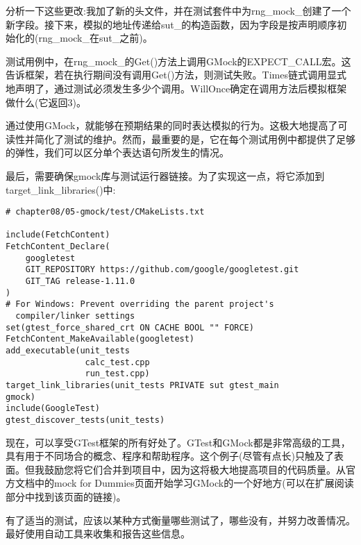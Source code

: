 分析一下这些更改:我加了新的头文件，并在测试套件中为rng\_mock\_创建了一个新字段。接下来，模拟的地址传递给sut\_的构造函数，因为字段是按声明顺序初始化的(rng\_mock\_在sut\_之前)。

测试用例中，在rng\_mock\_的Get()方法上调用GMock的EXPECT\_CALL宏。这告诉框架，若在执行期间没有调用Get()方法，则测试失败。Times链式调用显式地声明了，通过测试必须发生多少个调用。WillOnce确定在调用方法后模拟框架做什么(它返回3)。

通过使用GMock，就能够在预期结果的同时表达模拟的行为。这极大地提高了可读性并简化了测试的维护。然而，最重要的是，它在每个测试用例中都提供了足够的弹性，我们可以区分单个表达语句所发生的情况。

最后，需要确保gmock库与测试运行器链接。为了实现这一点，将它添加到target\_link\_libraries()中:

\begin{lstlisting}[style=styleCMake]
# chapter08/05-gmock/test/CMakeLists.txt

include(FetchContent)
FetchContent_Declare(
	googletest
	GIT_REPOSITORY https://github.com/google/googletest.git
	GIT_TAG release-1.11.0
)
# For Windows: Prevent overriding the parent project's
  compiler/linker settings
set(gtest_force_shared_crt ON CACHE BOOL "" FORCE)
FetchContent_MakeAvailable(googletest)
add_executable(unit_tests
				calc_test.cpp
				run_test.cpp)
target_link_libraries(unit_tests PRIVATE sut gtest_main
gmock)
include(GoogleTest)
gtest_discover_tests(unit_tests)
\end{lstlisting}

现在，可以享受GTest框架的所有好处了。GTest和GMock都是非常高级的工具，具有用于不同场合的概念、程序和帮助程序。这个例子(尽管有点长)只触及了表面。但我鼓励您将它们合并到项目中，因为这将极大地提高项目的代码质量。从官方文档中的mock for Dummies页面开始学习GMock的一个好地方(可以在扩展阅读部分中找到该页面的链接)。

有了适当的测试，应该以某种方式衡量哪些测试了，哪些没有，并努力改善情况。最好使用自动工具来收集和报告这些信息。

